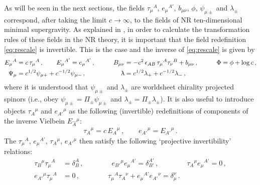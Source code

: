 \documentclass[a4paper,10pt,openany]{article}
\begin{document}
	As will be seen in the next sections, the fields $\tau_\mu{}^A$, $e_\mu{}^{A'}$, $b_{\mu\nu}$, $\phi$, $\psi_{\mu\pm}$ and $\lambda_{\pm}$ correspond, after taking the limit $c \rightarrow \infty$, to the fields of NR ten-dimensional minimal supergravity. As explained in \cite{Bergshoeff:2021bmc}, in order to calculate the transformation rules of these fields in the NR theory, it is important that the field redefinition \eqref{eq:rescale} is invertible. This is the case and the inverse of \eqref{eq:rescale} is given by
	\begin{alignat}{3}\label{eq:rescaleinv}
		E_\mu{}^A &= c\,\tau_\mu{}^A\,,\qquad  E_\mu{}^{A'} = e_\mu{}^{A'}\,,\qquad
		& B_{\mu\nu} &= -c^2 \, \epsilon_{AB}\,\tau_\mu{}^A \tau_\nu{}^B + b_{\mu\nu}\,,\qquad & \Phi &= \phi + \log c\,,\notag\\
		\Psi_{\mu} &= c^{1/2} \psi_{\mu +} + c^{-1/2} \psi_{\mu -} \,,\qquad & \uplambda &= c^{1/2} \lambda_+ + c^{-1/2} \lambda_- \,,
	\end{alignat}
	where it is understood that $\psi_{\mu\pm}$ and $\lambda_\pm$ are worldsheet chirality projected spinors (i.e., obey $\psi_{\mu\pm} = \Pi_\pm \psi_{\mu\pm}$ and $\lambda_\pm = \Pi_\pm \lambda_\pm$). It is also useful to introduce objects $\tau_A{}^\mu$ and $e_{A'}{}^\mu$ as the following (invertible) redefinitions of components of the inverse Vielbein $E_{\hat{A}}{}^\mu$:
	\begin{align}
		\label{eq:invErescale}
		\tau_A{}^\mu = c\, E_A{}^\mu \,, \qquad e_{A'}{}^\mu = E_{A'}{}^\mu\,.
	\end{align}
	The $\tau_\mu{}^A$, $e_\mu{}^{A'}$, $\tau_A{}^\mu$, $e_{A'}{}^\mu$ then satisfy the following `projective invertibility' relations:
	\begin{align}
		\label{eq:projinv}
		\tau_B{}^\mu \tau_\mu{}^A &= \delta^A_B \,, \qquad \qquad  e_{B'}{}^\mu e_{\mu}{}^{A'} = \delta^{A'}_{B'} \,, \qquad \qquad  \tau_A{}^\mu e_\mu{}^{A'} = 0 \,, \nonumber \\
		e_{A'}{}^\mu \tau_\mu{}^A &= 0 \,, \qquad \qquad \tau_\mu{}^A \tau_A{}^\nu + e_\mu{}^{A'} e_{A'}{}^\nu = \delta^\nu_\mu \,.
	\end{align}
	
\end{document}
